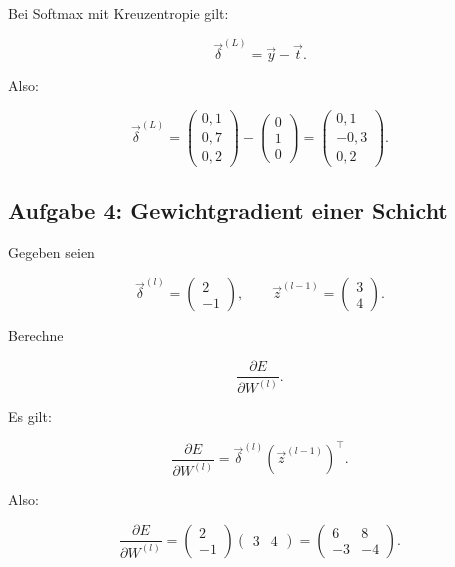 \begin{examplebox}
Bei Softmax mit Kreuzentropie gilt:

\[
    \vec{\delta}^{(L)}
    =
    \vec{y}-\vec{t}.
\]

Also:

\[
    \vec{\delta}^{(L)}
    =
    \begin{pmatrix}
        0{,}1 \\
        0{,}7 \\
        0{,}2
    \end{pmatrix}
    -
    \begin{pmatrix}
        0 \\
        1 \\
        0
    \end{pmatrix}
    =
    \begin{pmatrix}
        0{,}1 \\
        -0{,}3 \\
        0{,}2
    \end{pmatrix}.
\]
\end{examplebox}

\subsection{Aufgabe 4: Gewichtgradient einer Schicht}

Gegeben seien

\[
    \vec{\delta}^{(l)}
    =
    \begin{pmatrix}
        2 \\
        -1
    \end{pmatrix},
    \qquad
    \vec{z}^{(l-1)}
    =
    \begin{pmatrix}
        3 \\
        4
    \end{pmatrix}.
\]

Berechne

\[
    \frac{\partial E}{\partial W^{(l)}}.
\]

\begin{examplebox}
Es gilt:

\[
    \frac{\partial E}{\partial W^{(l)}}
    =
    \vec{\delta}^{(l)}
    (\vec{z}^{(l-1)})^{\top}.
\]

Also:

\[
    \frac{\partial E}{\partial W^{(l)}}
    =
    \begin{pmatrix}
        2 \\
        -1
    \end{pmatrix}
    \begin{pmatrix}
        3 & 4
    \end{pmatrix}
    =
    \begin{pmatrix}
        6 & 8 \\
        -3 & -4
    \end{pmatrix}.
\]
\end{examplebox}

